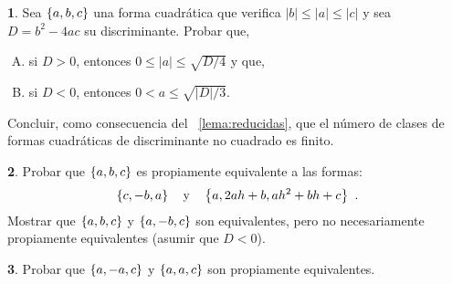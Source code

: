 \theoremstyle{definition}
\newtheorem{ejerDefinidas}{\ejername}[section]



\begin{ejerDefinidas}\label{ejer:definidas:numero}
	Sea $\left\{a,b,c\right\}$ una forma cuadr\'atica que verifica
	$|b|\leq |a|\leq |c|$ y sea $D=b^2-4ac$ su discriminante.
	Probar que,%
	\begin{enumerate}[(A)]
		\item\label{ejer:definidas:numero:indefinida}
			si $D>0$, entonces $0\leq |a|\leq\sqrt{D/4}$ y que,
		\item\label{ejer:definidas:numer:definida}
			si $D<0$, entonces $0<a\leq\sqrt{|D|/3}$.
	\end{enumerate}
	Concluir, como consecuencia del \lemaname~\ref{lema:reducidas},
	que el n\'umero de clases de formas cuadr\'aticas de
	discriminante no cuadrado es finito.
\end{ejerDefinidas}

\begin{ejerDefinidas}\label{ejer:definidas:equivalencia}
	Probar que $\left\{a,b,c\right\}$ es propiamente equivalente a
	las formas:
	\begin{displaymath}
		\left\{c,-b,a\right\}\quad\text{y}\quad\left\{a,2ah+b,ah^2+bh+c\right\}
		\text{ .}
	\end{displaymath}
	Mostrar que $\left\{a,b,c\right\}$ y $\left\{a,-b,c\right\}$ son
	equivalentes, pero no necesariamente propiamente equivalentes
	(asumir que $D<0$).
\end{ejerDefinidas}

\begin{ejerDefinidas}\label{ejer:definidas:equivalencia:caso}
	Probar que $\left\{a,-a,c\right\}$ y $\left\{a,a,c\right\}$ son
	propiamente equivalentes.
\end{ejerDefinidas}

